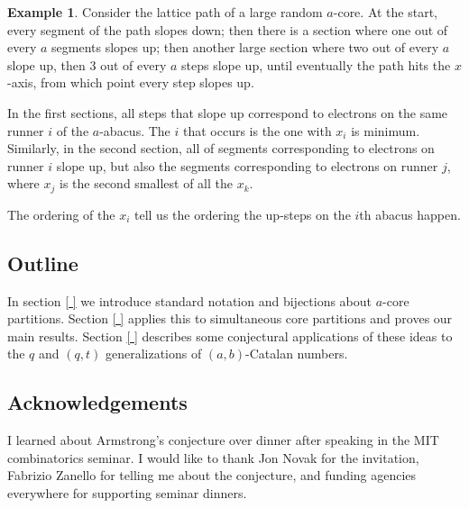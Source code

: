 \documentclass{amsart}[12pt]
\theoremstyle{definition}
\newtheorem{example}[dummy]{Example}
\begin{document}
\begin{example}
Consider the lattice path of a large random $a$-core.  At the start, every segment of the path slopes down; then there is a section where one out of every $a$ segments slopes up; then another large section where two out of every $a$ slope up, then 3 out of every $a$ steps slope up, until eventually the path hits the $x$-axis, from which point every step slopes up.

In the first sections, all steps that slope up correspond to electrons on the same runner $i$ of the $a$-abacus.  The $i$ that occurs is the one with $x_i$ is minimum.  Similarly, in the second section, all of segments corresponding to electrons on runner $i$ slope up, but also the segments corresponding to electrons on runner $j$, where $x_j$ is the second smallest of all the $x_k$.

The ordering of the $x_i$ tell us the ordering the up-steps on the $i$th abacus happen.

\end{example}




\subsection{Outline}
In section \ref{ } we introduce standard notation and bijections about $a$-core partitions.  Section \ref{ } applies this to simultaneous core partitions and proves our main results.  Section \ref{ } describes some conjectural applications of these ideas to the $q$ and $(q,t)$ generalizations of $(a,b)$-Catalan numbers.


\subsection{Acknowledgements}
I learned about Armstrong's conjecture over dinner after speaking in the MIT combinatorics seminar.  I would like to thank Jon Novak for the invitation, Fabrizio Zanello for telling me about the conjecture, and funding agencies everywhere for supporting seminar dinners.





\end{document}
